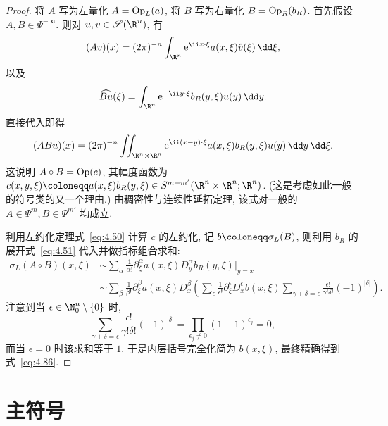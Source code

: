 \begin{proof}
将 $A$ 写为左量化 $A = \operatorname{Op}_L(a)$, 将 $B$ 写为右量化 $B = \operatorname{Op}_R(b_R)$. 首先假设 $A, B \in \Psi^{-\infty}$. 则对 $u, v \in \Schwartz(\R^n)$, 有
\[
    (A v)(x) = (2\pi)^{-n} \int_{\R^n} \ee^{\ii x \cdot \xi} a(x, \xi) \hat{v}(\xi) \,\dd\xi,
\]
以及
\begin{equation}\label{eq:4.87}
    \widehat{B u}(\xi) = \int_{\R^n} \ee^{-\ii y \cdot \xi} b_R(y, \xi) u(y) \,\dd y.
\end{equation}
直接代入即得
\begin{equation}\label{eq:4.88}
    (A B u)(x) = (2\pi)^{-n} \iint_{\R^n \times \R^n} \ee^{\ii (x-y) \cdot \xi} a(x, \xi) b_R(y, \xi) u(y) \,\dd y \,\dd\xi.
\end{equation}
这说明 $A \circ B = \operatorname{Op}(c)$, 其幅度函数为 $c(x, y, \xi) \defeq a(x, \xi) b_R(y, \xi) \in S^{m+m'}(\R^n \times \R^n; \R^n)$. (这是考虑如此一般的符号类的又一个理由.) 由稠密性与连续性延拓定理, 该式对一般的 $A \in \Psi^m, B \in \Psi^{m'}$ 均成立.

利用左约化定理式~\eqref{eq:4.50} 计算 $c$ 的左约化, 记 $b \defeq \sigma_L(B)$, 则利用 $b_R$ 的展开式~\eqref{eq:4.51} 代入并做指标组合求和:
\begin{equation}\label{eq:4.89}
    \begin{aligned}
        \sigma_L(A \circ B)(x, \xi) &\sim \sum_\alpha \frac{1}{\alpha!} \partial_\xi^\alpha a(x, \xi) D_y^\alpha b_R(y, \xi)|_{y=x} \\
        &\sim \sum_\beta \frac{1}{\beta!} \partial_\xi^\beta a(x, \xi) D_x^\beta \left( \sum_{\epsilon} \frac{1}{\epsilon!} \partial_\xi^\epsilon D_x^\epsilon b(x, \xi) \sum_{\gamma + \delta = \epsilon} \frac{\epsilon!}{\gamma! \delta!} (-1)^{|\delta|} \right).
    \end{aligned}
\end{equation}
注意到当 $\epsilon \in \N_0^n \setminus \{0\}$ 时,
\begin{equation}\label{eq:4.90}
    \sum_{\gamma + \delta = \epsilon} \frac{\epsilon!}{\gamma! \delta!} (-1)^{|\delta|} = \prod_{\epsilon_j \neq 0} (1 - 1)^{\epsilon_j} = 0,
\end{equation}
而当 $\epsilon = 0$ 时该求和等于 $1$. 于是内层括号完全化简为 $b(x, \xi)$, 最终精确得到式~\eqref{eq:4.86}.
\end{proof}

\section{主符号}\label{sec:4.5}
%
%
%

